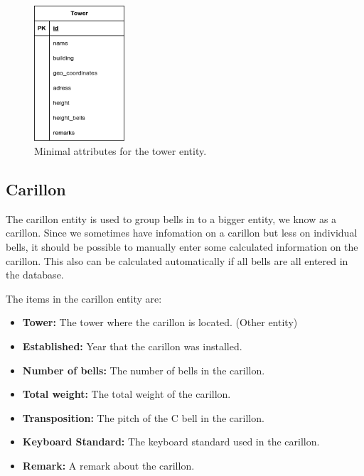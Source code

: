 \documentclass[11pt, a4paper]{article}
\begin{document}
\begin{figure}[h!]
    \centering
    \includegraphics[width=0.3\textwidth]{images/tower.png}
    \caption{Minimal attributes for the tower entity.}
    \label{fig:tower-entity}
\end{figure}

\subsection{Carillon}

The carillon entity is used to group bells in to a bigger entity, we know as a carillon. Since we sometimes have infomation on a carillon but less on individual bells,
it should be possible to manually enter some calculated information on the carillon.
This also can be calculated automatically if all bells are all entered in the database. 

The items in the carillon entity are:

\begin{itemize}
    \item \textbf{Tower:} The tower where the carillon is located. (Other entity)
    \item \textbf{Established:} Year that the carillon was installed.
    \item \textbf{Number of bells:} The number of bells in the carillon.
    \item \textbf{Total weight:} The total weight of the carillon.
    \item \textbf{Transposition:} The pitch of the C bell in the carillon.
    \item \textbf{Keyboard Standard:} The keyboard standard used in the carillon.
    \item \textbf{Remark:} A remark about the carillon.
\end{itemize}
\end{document}
